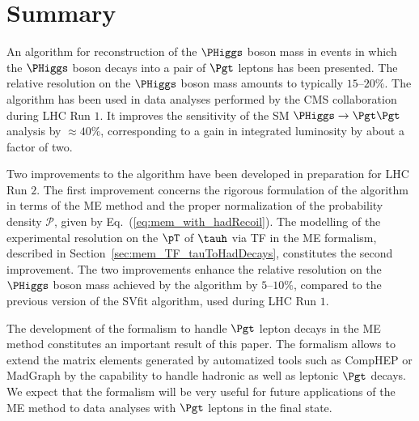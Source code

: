\section{Summary}
\label{sec:summary}

An algorithm for reconstruction of the $\PHiggs$ boson mass in events
in which the $\PHiggs$ boson decays into a pair of $\Pgt$ leptons has been
presented.
The relative resolution on the $\PHiggs$ boson mass amounts to typically
$15$--$20\%$.
The algorithm has been used in data analyses performed by the CMS
collaboration during LHC Run $1$.
It improves the sensitivity of the SM $\PHiggs \to \Pgt\Pgt$ analysis by $\approx 40\%$,
corresponding to a gain in integrated luminosity by about a factor of two.

Two improvements to the algorithm have been developed in preparation
for LHC Run $2$.
The first improvement concerns the rigorous formulation of the
algorithm in terms of the ME method
and the proper normalization of the probability density 
$\mathcal{P}$, given by Eq.~(\ref{eq:mem_with_hadRecoil}).
The modelling of the experimental resolution on the $\pT$ of $\tauh$ via TF in the ME
formalism, described in Section~\ref{sec:mem_TF_tauToHadDecays}, constitutes the second improvement.
The two improvements enhance the relative resolution on the $\PHiggs$ boson mass
achieved by the algorithm by $5$--$10\%$, 
compared to the previous version of the SVfit algorithm, used during LHC Run $1$.

The development of the formalism to handle $\Pgt$ lepton decays
in the ME method constitutes an important result of this paper.
The formalism allows to extend the matrix elements generated by automatized tools such as
CompHEP or MadGraph by the capability to handle hadronic as well as leptonic $\Pgt$ decays.
We expect that the formalism will be very useful for future
applications of the ME method to data analyses with $\Pgt$ leptons in
the final state. 
